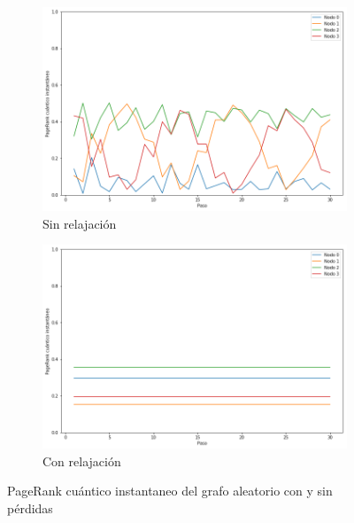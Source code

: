 \begin{figure}[H]
    \centering
    \begin{subfigure}[m]{0.45\textwidth}
        \centering
        \includegraphics[width=0.9\linewidth]{img/any-inst-lossless.png}
        \caption{Sin relajación}
    \end{subfigure}
    \begin{subfigure}[m]{0.45\textwidth}
        \centering
        \includegraphics[width=0.9\linewidth]{img/any-inst-lossy.png}
        \caption{Con relajación}
    \end{subfigure}
    \caption[PageRank cuántico instantaneo del grafo aleatorio con y sin pérdidas]{PageRank cuántico instantaneo del grafo aleatorio con y sin pérdidas}
    \label{fig:instanylossy}
\end{figure}

